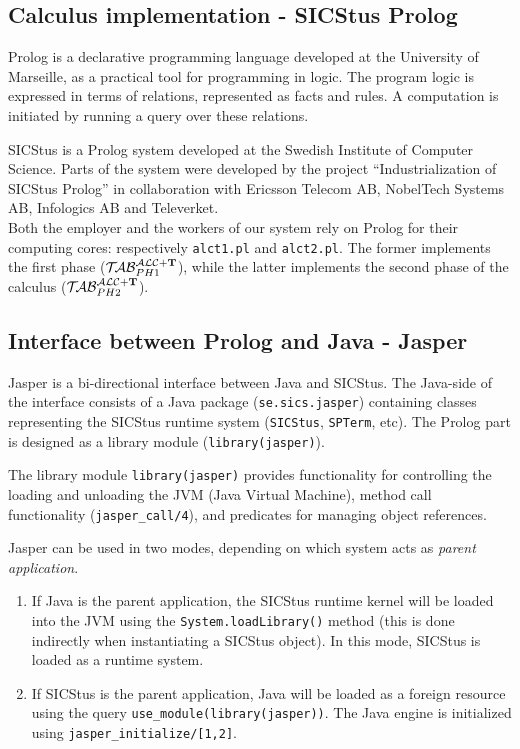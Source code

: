 \documentclass[a4paper, 11pt, oneside]{duthesis}
\newcommand{\tip}{{\bf T}}
\newcommand{\primo}{\mathrel{{\mathcal{T}\!\mathcal{AB}}}_{PH 1}^{\mathcal{ALC}+\mbox{\scriptsize $\tip$}}}
\newcommand{\secondo}{\mathrel{{\mathcal{T}\!\mathcal{AB}}}_{PH 2}^{\mathcal{ALC}+\mbox{\scriptsize $\tip$}}}
\begin{document}

\subsection{Calculus implementation - SICStus Prolog}

Prolog is a declarative programming language developed at the University of Marseille, as a practical tool for programming in logic. The program logic is expressed in terms of relations, represented as facts and rules. A computation is initiated by running a query over these relations\cite{Lloyd:1984:FLP:2214}.

SICStus is a Prolog system developed at the Swedish Institute of Computer Science. Parts of the system were developed by the project “Industrialization of SICStus Prolog” in collaboration with Ericsson Telecom AB, NobelTech Systems AB, Infologics AB and Televerket\cite{sicstus_intro}.\\

Both the employer and the workers of our system rely on Prolog for their computing cores: respectively \verb$alct1.pl$ and \verb$alct2.pl$. The former implements the first phase ($\primo$), while the latter implements the second phase of the calculus ($\secondo$).


\subsection{Interface between Prolog and Java - Jasper}\label{ssec_jasper}

Jasper is a bi-directional interface between Java and SICStus. The Java-side of the interface consists of a Java package (\verb$se.sics.jasper$) containing classes representing the SICStus runtime system (\verb$SICStus$, \verb$SPTerm$, etc). The Prolog part is designed as a library module (\verb$library(jasper)$).

The library module \verb$library(jasper)$  provides functionality for controlling the loading and unloading the JVM (Java Virtual Machine), method call functionality (\verb$jasper_call/4$), and predicates for managing object references.

Jasper can be used in two modes, depending on which system acts as \emph{parent application}.
\begin{enumerate}
\item If Java is the parent application, the SICStus runtime kernel will be loaded into the JVM using the \verb$System.loadLibrary()$ method (this is done indirectly when instantiating a SICStus object). In this mode, SICStus is loaded as a runtime system.

\item If SICStus is the parent application, Java will be loaded as a foreign resource using the query \verb$use_module(library(jasper))$. The Java engine is initialized using \verb$jasper_initialize/[1,2]$\cite{sicstus_jasper}.\\
\end{enumerate}
\end{document}
